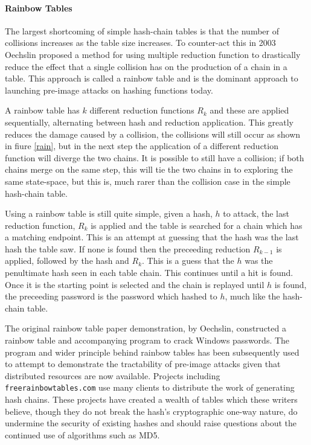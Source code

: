 \documentclass[a4paper,12pt]{article}
\begin{document}
\paragraph{Rainbow Tables}
The largest shortcoming of simple hash-chain tables is that the number of collisions increases as the table size increases. To counter-act this in 2003 Oechslin\cite{Oechslin} proposed a method for using multiple reduction function to drastically reduce the effect that a single collision has on the production of a chain in a table. This approach is called a rainbow table and is the dominant approach to launching pre-image attacks on hashing functions today.

A rainbow table has $k$ different reduction functions $R_k$ and these are applied sequentially, alternating between hash and reduction application. This greatly reduces the damage caused by a collision, the collisions will still occur as shown in fiure \ref{rain}, but in the next step the application of a different reduction function will diverge the two chains. It is possible to still have a collision; if both chains merge on the same step, this will tie the two chains in to exploring the same state-space, but this is, much rarer than the collision case in the simple hash-chain table.

Using a rainbow table is still quite simple, given a hash, $h$ to attack, the last reduction function, $R_k$ is applied and the table is searched for a chain which has a matching endpoint. This is an attempt at guessing that the hash was the last hash the table saw.
If none is found then the preceeding reduction $R_{k-1}$ is applied, followed by the hash and $R_k$. This is a guess that the $h$ was the penultimate hash seen in each table chain. This continues until a hit is found. Once it is the starting point is selected and the chain is replayed until $h$ is found, the preceeding password is the password which hashed to $h$, much like the hash-chain table.


The original rainbow table paper demonstration, by Oechslin, constructed a rainbow table and accompanying program to crack Windows passwords. The program and wider principle behind rainbow tables has been subsequently used to attempt to demonstrate the tractability of pre-image attacks given that distributed resources are now available. Projects including \texttt{freerainbowtables.com} use many clients to distribute the work of generating hash chains. These projects have created a wealth of tables which these writers believe, though they do not break the hash's cryptographic one-way nature, do undermine the security of existing hashes and should raise questions about the continued use of algorithms such as MD5.
\end{document}
